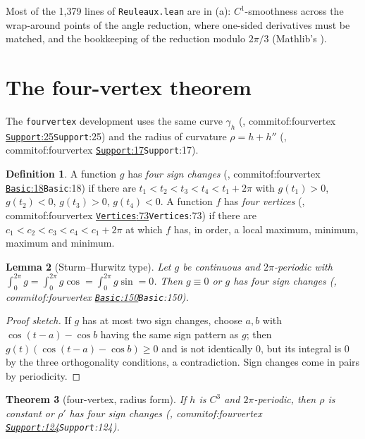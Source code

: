 \documentclass[11pt]{article}
\newtheorem{theorem}{Theorem}
\newtheorem{lemma}[theorem]{Lemma}
\theoremstyle{definition}
\newtheorem{definition}[theorem]{Definition}
\theoremstyle{remark}
\newcommand{\lean}[1]{\texttt{#1}}
\newcommand{\commitof}[1]{\csname commitof:#1\endcsname}
\newcommand{\repo}[1]{https://github.com/jpbald93/#1}
\newcommand{\src}[4]{\ifcsname commitof:#1\endcsname
  \href{\repo{#1}/blob/\commitof{#1}/#2/#3.lean\#L#4}{\texttt{#3}:#4}\else\texttt{#3}:#4\fi}
\begin{document}
Most of the 1{,}379 lines of \lean{Reuleaux.lean} are in (a): $C^1$-smoothness across the wrap-around
points of the angle reduction, where one-sided derivatives must be matched, and the bookkeeping of
the reduction modulo $2\pi/3$ (Mathlib's ).

\section{The four-vertex theorem}\label{sec:fourvertex}

The \lean{fourvertex} development uses the same curve $\gamma_h$ (, \src{fourvertex}{FourVertex}{Support}{25}) and the radius of curvature $\rho = h+h''$
(, \src{fourvertex}{FourVertex}{Support}{17}).

\begin{definition}
A function $g$ has \emph{four sign changes} (, \src{fourvertex}{FourVertex}{Basic}{18}) if there are $t_1<t_2<t_3<t_4<t_1+2\pi$ with $g(t_1)>0$,
$g(t_2)<0$, $g(t_3)>0$, $g(t_4)<0$. A function $f$ has \emph{four vertices}
(, \src{fourvertex}{FourVertex}{Vertices}{73}) if there are
$c_1<c_2<c_3<c_4<c_1+2\pi$ at which $f$ has, in order, a local maximum, minimum, maximum and minimum.
\end{definition}

\begin{lemma}[Sturm--Hurwitz type]\label{lem:sturm}
Let $g$ be continuous and $2\pi$-periodic with $\int_0^{2\pi}g = \int_0^{2\pi}g\cos =
\int_0^{2\pi}g\sin = 0$. Then $g\equiv 0$ or $g$ has four sign changes
(, \src{fourvertex}{FourVertex}{Basic}{150}).
\end{lemma}

\begin{proof}[Proof sketch]
If $g$ has at most two sign changes, choose $a,b$ with $\cos(t-a)-\cos b$ having the same sign
pattern as $g$; then $g(t)(\cos(t-a)-\cos b)\ge 0$ and is not identically $0$, but its integral is
$0$ by the three orthogonality conditions, a contradiction. Sign changes come in pairs by
periodicity.
\end{proof}

\begin{theorem}[four-vertex, radius form]\label{thm:radius}
If $h$ is $C^3$ and $2\pi$-periodic, then $\rho$ is constant or $\rho'$ has four sign changes
(, \src{fourvertex}{FourVertex}{Support}{124}).
\end{theorem}
\end{document}
